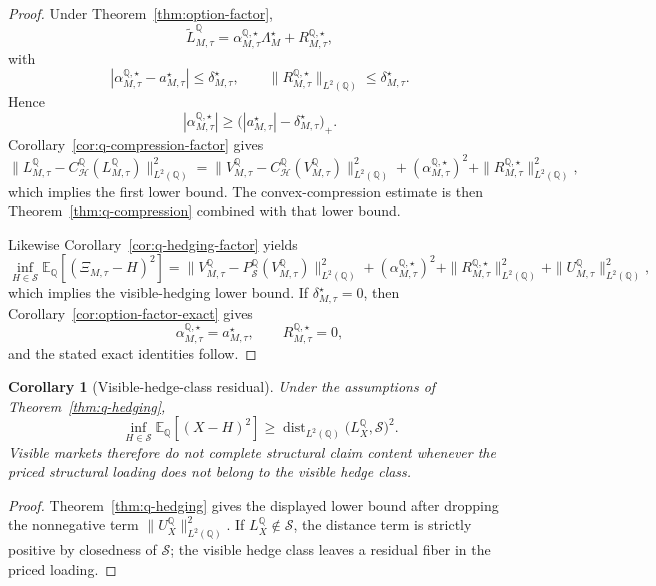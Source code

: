 \documentclass[11pt,a4paper]{amsart}
\theoremstyle{plain}
\newtheorem{corollary}[theorem]{Corollary}
\theoremstyle{definition}
\theoremstyle{remark}
\DeclareMathOperator{\dist}{dist}
\newcommand{\QQ}{\mathbb{Q}}
\newcommand{\EE}{\mathbb{E}}
\newcommand{\cH}{\mathcal{H}}
\newcommand{\cS}{\mathcal{S}}
\begin{document}
\begin{proof}
Under Theorem~\ref{thm:option-factor},
\[
        \widetilde L_{M,\tau}^\QQ
        =
        \alpha_{M,\tau}^{\QQ,\star}\Lambda_M^\star
        +
        R_{M,\tau}^{\QQ,\star},
\]
with
\[
        |\alpha_{M,\tau}^{\QQ,\star}-a_{M,\tau}^\star|
        \le
        \delta_{M,\tau}^\star,
        \qquad
        \|R_{M,\tau}^{\QQ,\star}\|_{L^2(\QQ)}
        \le
        \delta_{M,\tau}^\star.
\]
Hence
\[
        |\alpha_{M,\tau}^{\QQ,\star}|
        \ge
        \bigl(|a_{M,\tau}^\star|-\delta_{M,\tau}^\star\bigr)_+.
\]
Corollary~\ref{cor:q-compression-factor} gives
\[
        \|L_{M,\tau}^\QQ-C_{\cH}^\QQ(L_{M,\tau}^\QQ)\|_{L^2(\QQ)}^2
        =
        \|V_{M,\tau}^\QQ-C_{\cH}^\QQ(V_{M,\tau}^\QQ)\|_{L^2(\QQ)}^2
        +
        (\alpha_{M,\tau}^{\QQ,\star})^2
        +
        \|R_{M,\tau}^{\QQ,\star}\|_{L^2(\QQ)}^2,
\]
which implies the first lower bound.  The convex-compression estimate is then
Theorem~\ref{thm:q-compression} combined with that lower bound.

Likewise Corollary~\ref{cor:q-hedging-factor} yields
\[
        \inf_{H\in\cS}\EE_\QQ[(\Xi_{M,\tau}-H)^2]
        =
        \|V_{M,\tau}^\QQ-P_{\cS}^\QQ(V_{M,\tau}^\QQ)\|_{L^2(\QQ)}^2
        +
        (\alpha_{M,\tau}^{\QQ,\star})^2
        +
        \|R_{M,\tau}^{\QQ,\star}\|_{L^2(\QQ)}^2
        +
        \|U_{M,\tau}^\QQ\|_{L^2(\QQ)}^2,
\]
which implies the visible-hedging lower bound.  If \(\delta_{M,\tau}^\star=0\), then
Corollary~\ref{cor:option-factor-exact} gives
\[
        \alpha_{M,\tau}^{\QQ,\star}=a_{M,\tau}^\star,
        \qquad
        R_{M,\tau}^{\QQ,\star}=0,
\]
and the stated exact identities follow.
\end{proof}

\begin{corollary}[Visible-hedge-class residual]\label{cor:q-hedging-visible}
Under the assumptions of Theorem~\ref{thm:q-hedging},
\[
        \inf_{H\in \cS}\EE_\QQ[(X-H)^2]
        \ge
        \dist_{L^2(\QQ)}\!\bigl(L_X^\QQ,\cS\bigr)^2.
\]
Visible markets therefore do not complete structural claim content whenever the priced structural
loading does not belong to the visible hedge class.
\end{corollary}

\begin{proof}
Theorem~\ref{thm:q-hedging} gives the displayed lower bound after dropping the nonnegative term
\(\|U_X^\QQ\|_{L^2(\QQ)}^2\).  If \(L_X^\QQ\notin\cS\), the distance term is strictly positive by
closedness of \(\cS\); the visible hedge class leaves a residual fiber in the priced loading.
\end{proof}
\end{document}

